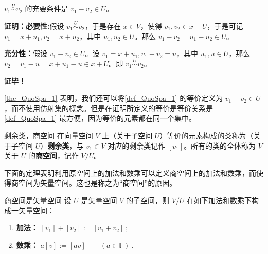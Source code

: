 
\begin{theorem}{}\label{the_QuoSpa_1}
 $v_1\overset{U}{\sim} v_2$ 的充要条件是 $v_1-v_2\in U$。
\end{theorem}
\textbf{证明：}\textbf{必要性:}假设 $v_1\overset{U}{\sim} v_2$，于是存在 $x\in V$，使得 $v_1,v_2\in x+U$，于是可记 $v_1=x+u_1,v_2=x+u_2$，其中 $u_1,u_2\in U$。那么 $v_1-v_2=u_1-u_2\in U$。

\textbf{充分性：}假设 $v_1-v_2\in U$。设 $v_1=x+u_1,v_1-v_2=u$，其中 $u_1,u\in U$，那么 $v_2=v_1-u=x+u_1-u\in x+U$。即 $v_1\overset{U}{\sim} v_2$。

\textbf{证毕！}

\autoref{the_QuoSpa_1} 表明，我们还可以将\autoref{def_QuoSpa_1} 的等价定义为 $v_1-v_2\in U$，而不使用仿射集的概念。但是在证明所定义的等价是等价关系是\autoref{def_QuoSpa_1} 最方便，因为等价的元素都在同一个集中。
\begin{definition}{剩余类，商空间}
在向量空间 $V$ 上（关于子空间 $U$）等价的元素构成的类称为（关于子空间 $U$）\textbf{剩余类}，与 $v_1\in V$ 对应的剩余类记作 $[v_1]$。所有的类的全体称为 $V$ 关于 $U$ 的\textbf{商空间}，记作 $V/U$。
\end{definition}

下面的定理表明利用原空间上的加法和数乘可以定义商空间上的加法和数乘，而使得商空间为矢量空间。这也是称之为“商空间”的原因。

\begin{theorem}{商空间是矢量空间}\label{the_QuoSpa_2}
设 $U$ 是矢量空间 $V$ 的子空间，则 $V/U$ 在如下加法和数乘下构成一矢量空间：
\begin{enumerate}
\item \textbf{加法：}
$[v_1] + [v_2] := [v_1 + v_2]~;$
\item \textbf{数乘：} $a [v] := [a v]\qquad (a \in \mathbb F)~.$
\end{enumerate}
\end{theorem}

